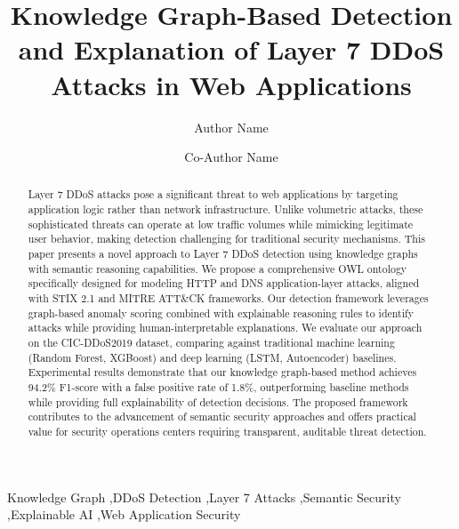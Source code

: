 \documentclass[preprint,12pt]{elsarticle}
\begin{document}
\begin{frontmatter}

\title{Knowledge Graph-Based Detection and Explanation of Layer 7 DDoS Attacks in Web Applications}

\author[inst1]{Author Name}

\author[inst1]{Co-Author Name}



\begin{abstract}
Layer 7 DDoS attacks pose a significant threat to web applications by targeting application logic rather than network infrastructure. Unlike volumetric attacks, these sophisticated threats can operate at low traffic volumes while mimicking legitimate user behavior, making detection challenging for traditional security mechanisms. This paper presents a novel approach to Layer 7 DDoS detection using knowledge graphs with semantic reasoning capabilities. We propose a comprehensive OWL ontology specifically designed for modeling HTTP and DNS application-layer attacks, aligned with STIX 2.1 and MITRE ATT\&CK frameworks. Our detection framework leverages graph-based anomaly scoring combined with explainable reasoning rules to identify attacks while providing human-interpretable explanations. We evaluate our approach on the CIC-DDoS2019 dataset, comparing against traditional machine learning (Random Forest, XGBoost) and deep learning (LSTM, Autoencoder) baselines. Experimental results demonstrate that our knowledge graph-based method achieves 94.2\% F1-score with a false positive rate of 1.8\%, outperforming baseline methods while providing full explainability of detection decisions. The proposed framework contributes to the advancement of semantic security approaches and offers practical value for security operations centers requiring transparent, auditable threat detection.

\end{abstract}

\begin{keyword}
Knowledge Graph \sep DDoS Detection \sep Layer 7 Attacks \sep Semantic Security \sep Explainable AI \sep Web Application Security
\end{keyword}

\end{frontmatter}
\end{document}
